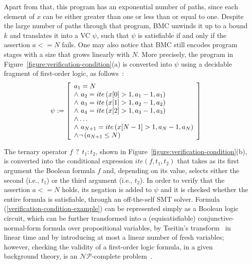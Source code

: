 \documentclass[format=acmsmall, review=false, screen=true]{acmart}
\begin{document}
Apart from that, this program has an exponential number of paths, since each element of $x$ can be either greater than one or less than or equal to one. Despite the large number of paths through that program, BMC unwinds it up to a bound $k$ and translates it into a VC $\psi$, such that $\psi$ is satisfiable if and only if the assertion $a<=N$ fails. One may also notice that BMC still encodes program stages with a size that grows linearly with $N$. More precisely, the program in Figure~\ref{figure:verification-condition}(a) is converted into $\psi$ using a decidable fragment of first-order logic, as follows~\cite{Bradley07}:
%
\begin{equation}              
\label{verification-condition-example}
\psi := \left [ \begin{array}{ll} 
                a_{1} = N  \\
                \wedge \, \, a_{2} = ite\left(x[0] > 1, a_{1} - 1, a_{1}\right) \\ 
                \wedge \, \, a_{3} = ite\left(x[1] > 1, a_{2} - 1, a_{2}\right) \\
                \wedge \, \, a_{4} = ite\left(x[2] > 1, a_{3} - 1, a_{3}\right) \\
                \wedge \ldots \\
                \wedge \, \, a_{N+1} = ite\left(x[N-1] > 1, a_{N} - 1 , a_{N}\right) \\
                \wedge \neg \left(a_{N+1} \leq N\right) \\
              \end{array} \right ]  \\
              \\           
\end{equation}

The ternary operator $f \: \: ? \: \: t_1 : t_2$, shown in Figure~\ref{figure:verification-condition}(b), is converted into the conditional expression $\mathit{ite}(f, t_1, t_2)$ that takes as its first argument the Boolean formula $f$ and, depending on its value, selects either the second (i.e., $t_1$) or the third argument (i.e., $t_2$). In order to verify that the assertion $a<=N$ holds, its negation is added to $\psi$ and it is checked whether the entire formula is satisfiable, through an off-the-self SMT solver. Formula (\ref{verification-condition-example}) can be represented simply as a Boolean logic circuit, which can be further transformed into a (equisatisfiable) conjunctive-normal-form formula over propositional variables, by Tseitin's transform~\cite{Tseitin83} in linear time and by introducing at most a linear number of fresh variables; however, checking the validity of a first-order logic formula, in a given background theory, is an ${\mathcal{NP}}$-complete problem~\cite{PatarinG97}.
\end{document}
